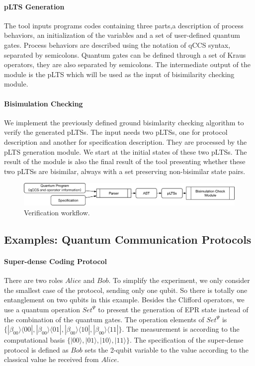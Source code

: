 \documentclass[a4paper,UKenglish,cleveref, autoref]{lipics-v2019}
\begin{document}
\paragraph*{pLTS Generation}
The tool inputs programs codes containing three parts,a description of process behaviors, an initialization of the variables and a set of user-defined quantum gates. Process behaviors are described using the notation of qCCS syntax, separated by semicolons. Quantum gates can be defined through a set of Kraus operators, they are also separated by semicolons. The intermediate output of the module is the pLTS which will be used as the input of bisimilarity checking module.
\paragraph*{Bisimulation Checking}
We implement the previously defined ground bisimlarity checking algorithm to verify the generated pLTSs. The input needs two pLTSs, one for protocol description and another for specification description. They are processed by the pLTS generation module. We start at the initial states of these two pLTSs. The result of the module is also the final result of the tool presenting whether these two pLTSs are bisimilar, always with a set preserving non-bisimilar state pairs.
\begin{figure}
\centering
\includegraphics[width=\textwidth]{images/architecture.eps}
\caption{Verification workflow.}
\label{fig:arch}
\end{figure}
\subsection{Examples: Quantum Communication Protocols}
\paragraph*{Super-dense Coding Protocol} There are two roles $Alice$ and $Bob$. To simplify the experiment, we only consider the smallest case of the protocol, sending only one qubit. So there is totally one entanglement on two qubits in this example. Besides the Clifford operators, we use a quantum operation $Set^{\Psi}$ to present the generation of EPR state instead of the combination of the quantum gates. The operation elements of $Set^{\Psi}$ is $\{|\beta_{00}\rangle\langle00|,|\beta_{00}\rangle\langle01|,|\beta_{00}\rangle\langle10|,|\beta_{00}\rangle\langle11|\}$. The measurement is according to the computational basis $\{|00\rangle,|01\rangle,|10\rangle,|11\rangle\}$. The specification of the super-dense protocol is defined as $Bob$ sets the 2-qubit variable to the value according to the classical value he received from $Alice$.
\end{document}
